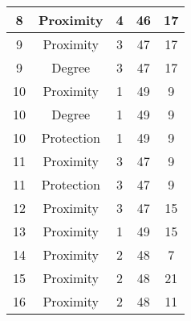 \documentclass[results.tex]{subfiles}
\begin{document}
\begin{center}
\begin{tabular}{| c || c | c | c | c |}
            \hline
            8                       & Proximity                    & 4                      & 46                      & 17                   \\
            \hline
            9                       & Proximity                    & 3                      & 47                      & 17                   \\
            \hline
            9                       & Degree                       & 3                      & 47                      & 17                   \\
            \hline
            10                      & Proximity                    & 1                      & 49                      & 9                    \\
            \hline
            10                      & Degree                       & 1                      & 49                      & 9                    \\
            \hline
            10                      & Protection                   & 1                      & 49                      & 9                    \\
            \hline
            11                      & Proximity                    & 3                      & 47                      & 9                    \\
            \hline
            11                      & Protection                   & 3                      & 47                      & 9                    \\
            \hline
            12                      & Proximity                    & 3                      & 47                      & 15                   \\
            \hline
            13                      & Proximity                    & 1                      & 49                      & 15                   \\
            \hline
            14                      & Proximity                    & 2                      & 48                      & 7                    \\
            \hline
            15                      & Proximity                    & 2                      & 48                      & 21                   \\
            \hline
            16                      & Proximity                    & 2                      & 48                      & 11                   \\

\end{tabular}
\end{center}
\end{document}
